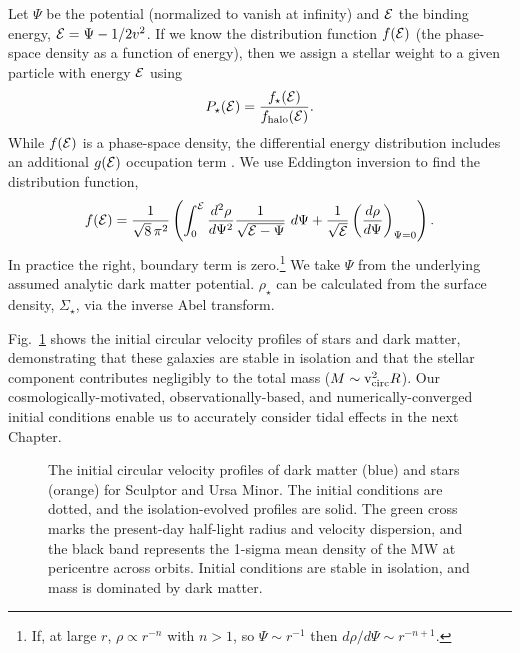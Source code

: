 Let \(\Psi\) be the potential (normalized to vanish at infinity) and
\({\cal E}\) the binding energy, \({\cal E} = \Psi - 1/2 v^2\). If we
know the distribution function \(f({\cal E})\) (the phase-space density
as a function of energy), then we assign a stellar weight to a given
particle with energy \({\cal E}\) using \begin{equation}{
P_\star({\cal E}) = \frac{f_\star({\cal E})}{f_{\rm halo}({\cal E})}.
}\end{equation} While \(f({\cal E})\) is a phase-space density, the
differential energy distribution includes an additional \(g({\cal E})\)
occupation term \citep{BT1987}. We use Eddington inversion to find the
distribution function, \citep[eq. 4-140b in][]{BT1987} \begin{equation}{
f({\cal E}) = \frac{1}{\sqrt{8}\, \pi^2}\left( \int_0^{\cal E} \frac{d^2\rho}{d\Psi^2} \frac{1}{\sqrt{{\cal E} - \Psi}}\ d\Psi + \frac{1}{\sqrt{\cal E}} \left(\frac{d\rho}{d\Psi}\right)_{\Psi=0} \right).
}\end{equation} In practice the right, boundary term is zero.\footnote{If,
  at large \(r\), \(\rho \propto r^{-n}\) with \(n>1\), so
  \(\Psi \sim r^{-1}\) then \(d\rho / d\Psi \sim r^{-n+1}\).} We take
\(\Psi\) from the underlying assumed analytic dark matter potential.
\(\rho_\star\) can be calculated from the surface density,
\(\Sigma_\star\), via the inverse Abel transform.

Fig.~\ref{fig:scl_umi_initial_isolation} shows the initial circular
velocity profiles of stars and dark matter, demonstrating that these
galaxies are stable in isolation and that the stellar component
contributes negligibly to the total mass (\(M \sim {\rm v}_{\rm circ}^2 R\)).
Our cosmologically-motivated, observationally-based, and
numerically-converged initial conditions enable us to accurately
consider tidal effects in the next Chapter.

\begin{figure}
\centering
{}
\caption[Initial halo velocity profiles]{The initial circular velocity
profiles of dark matter (blue) and stars (orange) for Sculptor and Ursa
Minor. The initial conditions are dotted, and the isolation-evolved
profiles are solid. The green cross marks the present-day half-light
radius and velocity dispersion, and the black band represents the
1-sigma mean density of the MW at pericentre across orbits. Initial
conditions are stable in isolation, and mass is dominated by dark
matter.}\label{fig:scl_umi_initial_isolation}
\end{figure}
